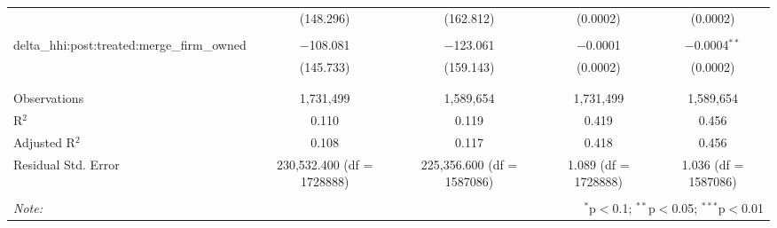 \begin{table}[H]
{\begin{tabular}{@{\extracolsep{5pt}}lcccc}
   & (148.296) & (162.812) & (0.0002) & (0.0002) \\  

   & & & & \\  

  delta\_hhi:post:treated:merge\_firm\_owned & $-$108.081 & $-$123.061 & $-$0.0001 & $-$0.0004$^{**}$ \\  

   & (145.733) & (159.143) & (0.0002) & (0.0002) \\  

   & & & & \\  

 \hline \\[-1.8ex]  

 Observations & 1,731,499 & 1,589,654 & 1,731,499 & 1,589,654 \\  

 R$^{2}$ & 0.110 & 0.119 & 0.419 & 0.456 \\  

 Adjusted R$^{2}$ & 0.108 & 0.117 & 0.418 & 0.456 \\  

 Residual Std. Error & 230,532.400 (df = 1728888) & 225,356.600 (df = 1587086) & 1.089 (df = 1728888) & 1.036 (df = 1587086) \\  

 \hline  

 \hline \\[-1.8ex]  

 \textit{Note:}  & \multicolumn{4}{r}{$^{*}$p$<$0.1; $^{**}$p$<$0.05; $^{***}$p$<$0.01} \\  

 \end{tabular}}  

 \end{table}  

 



